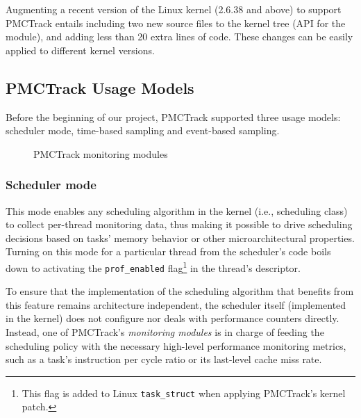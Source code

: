
Augmenting a recent version of the Linux kernel (2.6.38 and above) to support PMCTrack entails including two new source files to the kernel tree (API for the module), and adding less than 20 extra lines of code. These changes can be easily applied to different kernel versions.

\subsection{PMCTrack Usage Models}\label{pmctrack-usage-models}

Before the beginning of our project, PMCTrack supported three
usage models: scheduler mode, time-based sampling and event-based
sampling.

\begin{figure}[tbp!]
\centering
{}

\caption{PMCTrack monitoring modules}
\label{fig:mmon}
\end{figure}

\subsubsection{Scheduler mode}\label{scheduler-mode}

This mode enables any scheduling algorithm in the kernel (i.e.,
scheduling class) to collect per-thread monitoring data, thus making it
possible to drive scheduling decisions based on tasks' memory behavior
or other microarchitectural properties. Turning on this mode for a
particular thread from the scheduler's code boils down to activating the
\texttt{prof\_enabled}
flag\footnote{This flag is added to Linux \texttt{task\_struct} when applying PMCTrack's kernel patch.}
in the thread's descriptor.

To ensure that the implementation of the scheduling algorithm that
benefits from this feature remains architecture independent, the
scheduler itself (implemented in the kernel) does not configure nor
deals with performance counters directly. Instead, one of PMCTrack's
\textit{monitoring modules} is in charge of feeding the scheduling
policy with the necessary high-level performance monitoring metrics,
such as a task's instruction per cycle ratio or its last-level cache
miss rate.


